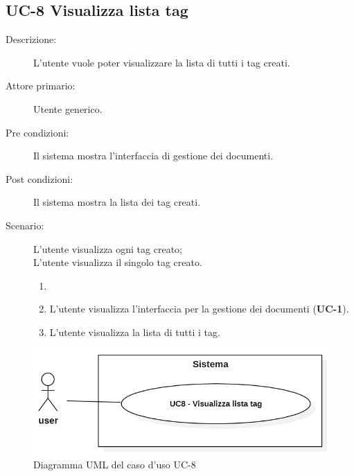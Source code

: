 \subsection{UC-8 Visualizza lista tag}
\begin{description}
    \item[Descrizione:] L’utente vuole poter visualizzare la lista di tutti i tag creati.
    \item[Attore primario:] Utente generico.
    \item[Pre condizioni:] Il sistema mostra l'interfaccia di gestione dei documenti.
    \item[Post condizioni:] Il sistema mostra la lista dei tag creati.
    \item[Scenario:] L'utente visualizza ogni tag creato;\\L'utente visualizza il singolo tag creato.
    \begin{enumerate}
        \item[] 
        \item L’utente visualizza l'interfaccia per la gestione dei documenti (\textbf{UC-1}).
        \item L’utente visualizza la lista di tutti i tag.
    \end{enumerate}
\end{description}
\begin{figure}[H]
    \centering
    \includegraphics[width=0.8\linewidth]{UC8.PNG}
    \caption{Diagramma UML del caso d'uso UC-8}
    \label{fig:UC8}
\end{figure}


